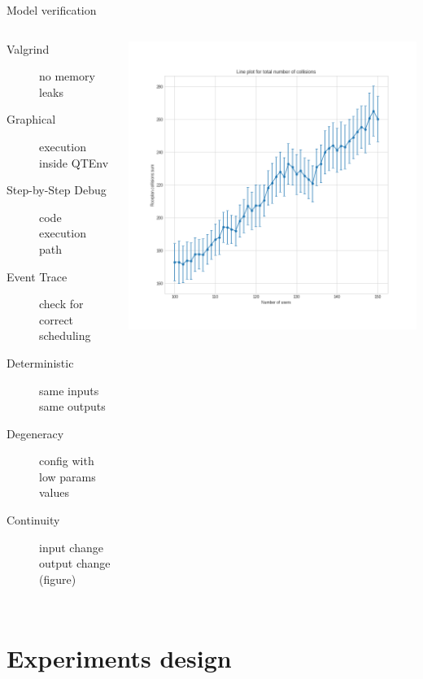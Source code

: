 \documentclass[aspectratio=169]{beamer}
\begin{document}
\begin{frame}{Model verification}
	\begin{columns}
		\begin{description}
			\item[Valgrind] no memory leaks
			\item[Graphical] execution inside QTEnv
			\item[Step-by-Step Debug] code execution path
			\item[Event Trace] check for correct scheduling
			\item[Deterministic] same inputs \textrightarrow{} same outputs
			\item[Degeneracy] config with low params values
			\item[Continuity] input change \textrightarrow{} output
				change (figure)
		\end{description}
		\includegraphics[width=\textwidth]{img/continuity-collisions}
	\end{columns}
\end{frame}

\section{Experiments design}
\end{document}
